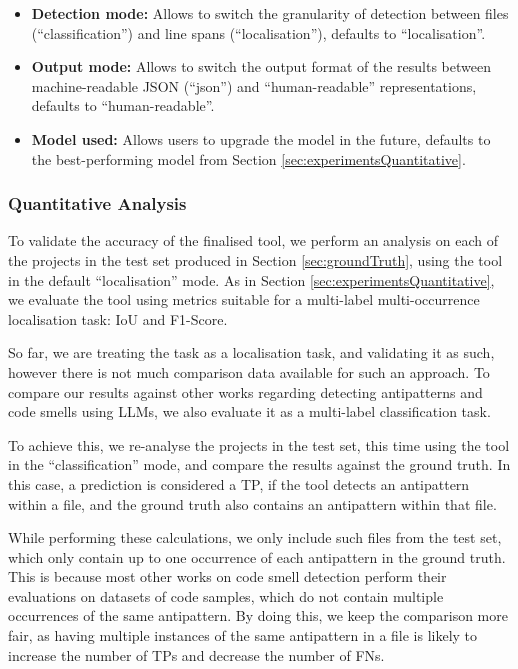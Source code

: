 \documentclass{article}
\begin{document}
\begin{itemize}
  \item \textbf{Detection mode:} Allows to switch the granularity of detection between files (“classification”) and line spans (“localisation”), defaults to “localisation”.
  \item \textbf{Output mode:} Allows to switch the output format of the results between machine-readable JSON (“json”) and “human-readable” representations, defaults to “human-readable”.
  \item \textbf{Model used:} Allows users to upgrade the model in the future, defaults to the best-performing model from Section \ref{sec:experimentsQuantitative}.
\end{itemize}

\subsubsection{Quantitative Analysis}\label{sec:developmentQuantitative}

To validate the accuracy of the finalised tool, we perform an analysis on each of the projects in the test set produced in Section \ref{sec:groundTruth}, using the tool in the default “localisation” mode. As in Section \ref{sec:experimentsQuantitative}, we evaluate the tool using metrics suitable for a multi-label multi-occurrence localisation task: IoU and F1-Score.

So far, we are treating the task as a localisation task, and validating it as such, however there is not much comparison data available for such an approach. To compare our results against other works regarding detecting antipatterns and code smells using LLMs, we also evaluate it as a multi-label classification task.

To achieve this, we re-analyse the projects in the test set, this time using the tool in the “classification” mode, and compare the results against the ground truth. In this case, a prediction is considered a TP, if the tool detects an antipattern within a file, and the ground truth also contains an antipattern within that file.

While performing these calculations, we only include such files from the test set, which only contain up to one occurrence of each antipattern in the ground truth. This is because most other works on code smell detection perform their evaluations on datasets of code samples, which do not contain multiple occurrences of the same antipattern. By doing this, we keep the comparison more fair, as having multiple instances of the same antipattern in a file is likely to increase the number of TPs and decrease the number of FNs.
\end{document}
